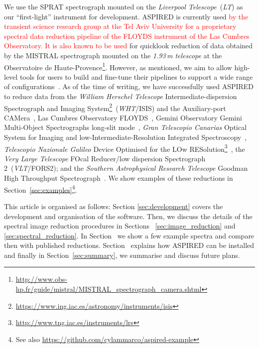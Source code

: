 \documentclass[linenumbers, twocolumn]{aastex631}
\begin{document}
We use the SPRAT spectrograph \citep{2014SPIE.9147E..8HP} mounted on the \textit{Liverpool Telescope}~(\textit{LT}) as our
``first-light'' instrument for development. \textsc{ASPIRED} is currently used
\textcolor{red}{by the transient science research group at the Tel Aviv University
for a proprietary spectral data reduction pipeline of the FLOYDS instrument of
the Las Cumbres Observatory. It is also known to be used}
for quicklook reduction of data obtained by the MISTRAL spectrograph
mounted on the \textit{1.93\,m telescope} at the Observatoire de
Haute-Provence\footnote{\url{http://www.obs-hp.fr/guide/mistral/MISTRAL_spectrograph_camera.shtml}}.
However, as mentioned, we aim to allow high-level tools for users to build and
fine-tune their pipelines to support a wide range of
configurations~\citep{2020arXiv201203505L, marco_2021_4463569}. As of the time
of writing, we have successfully used \textsc{ASPIRED} to reduce data from the
\textit{William Herschel Telescope} Intermediate-dispersion Spectrograph and
Imaging System\footnote{\url{https://www.ing.iac.es/astronomy/instruments/isis}}~(\textit{WHT}/ISIS)
and the Auxiliary-port CAMera~\citep[ACAM;][]{2008SPIE.7014E..6XB}, Las Cumbres
Observatory FLOYDS~\citep[Las Cumbres/FLOYDS;][]{2013PASP..125.1031B}, Gemini Observatory
Gemini Multi-Object Spectrographs long-slit
mode~\citep[Gemini/GMOS-LS;][]{2004PASP..116..425H}, \textit{Gran Telescopio Canarias}
Optical System for Imaging and low-Intermediate-Resolution Integrated
Spectroscopy~\citep[GTC/OSIRIS;][]{2000SPIE.4008..623C},  \textit{Telescopio
Nazionale Galileo} Device Optimised for the LOw
RESolution\footnote{\url{http://www.tng.iac.es/instruments/lrs}}~\citep[\textit{TNG}/DOLORES;][]{1999ldss.work..157M},
the \textit{Very Large Telescope} FOcal Reducer/low dispersion Spectrograph 2~(\textit{VLT}/FORS2); and the \textit{Southern Astrophysical Research Telescope} Goodman High Throughput Spectrograph~\citep[\textit{SOAR}/GHTS][]{2004SPIE.5492..331C}.
We show examples of these reductions in Section~\ref{sec:examples}\footnote{See
also \url{https://github.com/cylammarco/aspired-example}}. 

This article is organised as follows: Section \textsection\ref{sec:development}
covers the development and organisation of the software. Then, we discuss the
details of the spectral image reduction procedures in Sections~\textsection
\ref{sec:image_reduction} and \ref{sec:spectral_reduction}. In
Section~\textsection{\ref{sec:examples}} we show a few example spectra and
compare then with published reductions.
Section~\textsection{\ref{sec:distribution}}
explains how \textsc{ASPIRED} can be installed and finally in 
Section~\textsection\ref{sec:summary}, we summarise and discuss future
plans.
\end{document}

